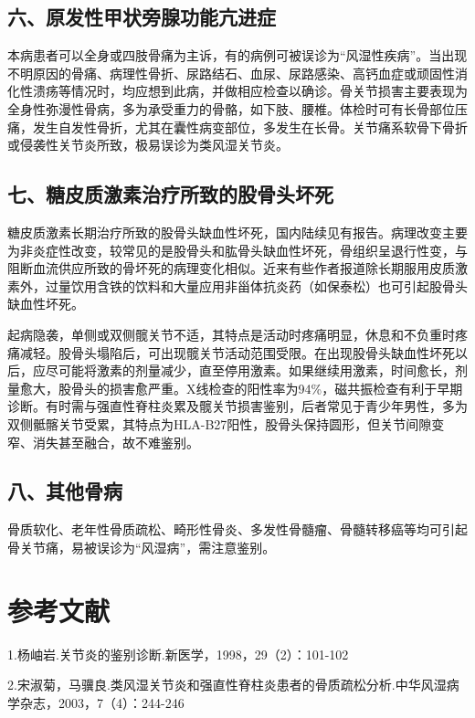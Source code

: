 \subsection{六、原发性甲状旁腺功能亢进症}

本病患者可以全身或四肢骨痛为主诉，有的病例可被误诊为“风湿性疾病”。当出现不明原因的骨痛、病理性骨折、尿路结石、血尿、尿路感染、高钙血症或顽固性消化性溃疡等情况时，均应想到此病，并做相应检查以确诊。骨关节损害主要表现为全身性弥漫性骨病，多为承受重力的骨骼，如下肢、腰椎。体检时可有长骨部位压痛，发生自发性骨折，尤其在囊性病变部位，多发生在长骨。关节痛系软骨下骨折或侵袭性关节炎所致，极易误诊为类风湿关节炎。

\subsection{七、糖皮质激素治疗所致的股骨头坏死}

糖皮质激素长期治疗所致的股骨头缺血性坏死，国内陆续见有报告。病理改变主要为非炎症性改变，较常见的是股骨头和肱骨头缺血性坏死，骨组织呈退行性变，与阻断血流供应所致的骨坏死的病理变化相似。近来有些作者报道除长期服用皮质激素外，过量饮用含铁的饮料和大量应用非甾体抗炎药（如保泰松）也可引起股骨头缺血性坏死。

起病隐袭，单侧或双侧髋关节不适，其特点是活动时疼痛明显，休息和不负重时疼痛减轻。股骨头塌陷后，可出现髋关节活动范围受限。在出现股骨头缺血性坏死以后，应尽可能将激素的剂量减少，直至停用激素。如果继续用激素，时间愈长，剂量愈大，股骨头的损害愈严重。X线检查的阳性率为94\%，磁共振检查有利于早期诊断。有时需与强直性脊柱炎累及髋关节损害鉴别，后者常见于青少年男性，多为双侧骶髂关节受累，其特点为HLA-B27阳性，股骨头保持圆形，但关节间隙变窄、消失甚至融合，故不难鉴别。

\subsection{八、其他骨病}

骨质软化、老年性骨质疏松、畸形性骨炎、多发性骨髓瘤、骨髓转移癌等均可引起骨关节痛，易被误诊为“风湿病”，需注意鉴别。

\protect\hypertarget{text00331.html}{}{}

\section{参考文献}

1.杨岫岩.关节炎的鉴别诊断.新医学，1998，29（2）：101-102

2.宋淑菊，马骥良.类风湿关节炎和强直性脊柱炎患者的骨质疏松分析.中华风湿病学杂志，2003，7（4）：244-246

